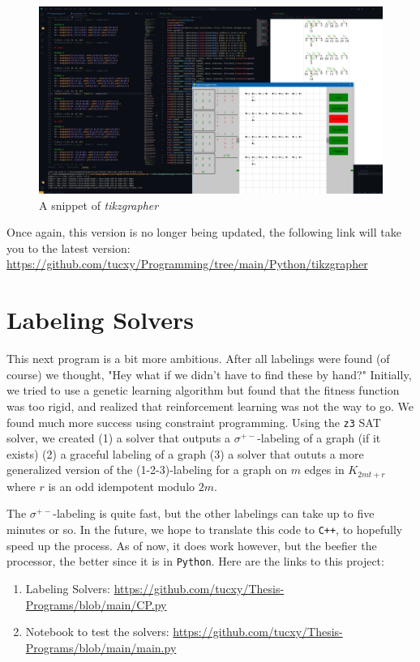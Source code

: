\begin{figure}[H]
  \centering
  \includegraphics[width=\textwidth]{standalone/Images/snippet_long.JPG}
  \caption{A snippet of \textit{tikzgrapher}}
  \label{fig:TGsnippet}
\end{figure}


Once again, this version is no longer being updated, the following link will take you to the latest version: \url{https://github.com/tucxy/Programming/tree/main/Python/tikzgrapher} \newline

\section{Labeling Solvers}
This next program is a bit more ambitious. After all labelings were found (of course) we thought, "Hey what if we didn't have to find these by hand?" Initially, we tried to use a genetic learning algorithm but found that the fitness function was too rigid, and realized that reinforcement learning was not the way to go. We found much more success using constraint programming. Using the \verb|z3| SAT solver, we created (1) a solver that outputs a $\sigma^{+-}$-labeling of a graph (if it exists) (2) a graceful labeling of a graph (3) a solver that oututs a more generalized version of the (1-2-3)-labeling for a graph on $m$ edges in $K_{2mt+r}$ where $r$ is an odd idempotent modulo $2m$.

The $\sigma^{+-}$-labeling is quite fast, but the other labelings can take up to five minutes or so. In the future, we hope to translate this code to \verb|C++|, to hopefully speed up the process. As of now, it does work however, but the beefier the processor, the better since it is in \verb|Python|. Here are the links to this project:

\begin{enumerate}
  \item  Labeling Solvers: \url{https://github.com/tucxy/Thesis-Programs/blob/main/CP.py}
  \item  Notebook to test the solvers: \url{https://github.com/tucxy/Thesis-Programs/blob/main/main.py}
\end{enumerate}

